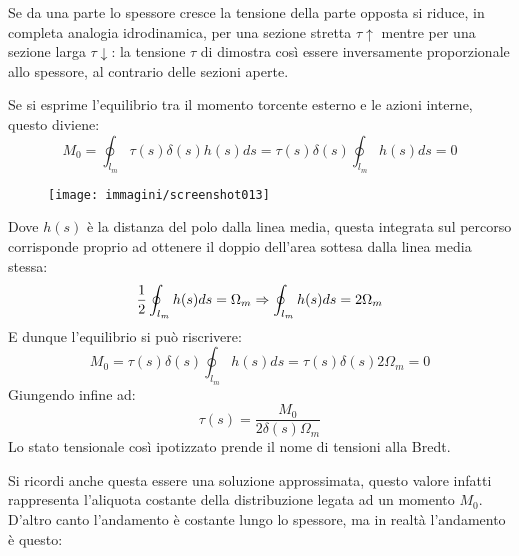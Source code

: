 \documentclass{article}
\begin{document}
\begin{adjustwidth}{2in}{}
\begin{figure}[H]
\begin{flushright}
	\end{flushright}
\end{figure}
		Se da una parte lo spessore cresce la tensione della parte opposta si riduce, in completa analogia idrodinamica, per una sezione stretta $\tau\uparrow$ mentre per una sezione larga $\tau\downarrow$: la tensione $\tau$ di dimostra così essere inversamente proporzionale allo spessore, al contrario delle sezioni aperte.\newline 
		
		Se si esprime l'equilibrio tra il momento torcente esterno e le azioni interne, questo diviene: 
		\[ M_0 = \oint_{l_m}\tau(s)\delta(s)h(s)ds = \tau(s)\delta(s)\oint_{l_m}h(s)ds = 0\]
		
\begin{figure}[H]
	\centering
	\label{fig:screenshot013}
	\texttt{[image: immagini/screenshot013]}
\end{figure}

		Dove $ h(s) $ è la distanza del polo dalla linea media, questa integrata sul percorso corrisponde proprio ad ottenere  il doppio dell'area sottesa dalla linea media stessa:
		\[{1\over2} \oint_{l_m}h(s)ds = \Omega_m \Rightarrow \oint_{l_m}h(s)ds = 2 \Omega_m\]
		E dunque l'equilibrio si può riscrivere: 
		\[ M_0 = \tau(s)\delta(s)\oint_{l_m}h(s)ds = \tau(s)\delta(s)2 \Omega_m = 0\]
		Giungendo infine ad: 
		\[ \tau(s) = \dfrac{M_0}{2\delta(s) \Omega_m}\]
		Lo stato tensionale così ipotizzato prende il nome di tensioni alla
		Bredt. \newline 
		
		Si ricordi anche questa essere una soluzione approssimata,	questo valore infatti rappresenta l’aliquota costante della distribuzione legata ad un momento $M_0$. D'altro canto l'andamento è costante lungo lo spessore, ma in realtà l'andamento è questo: 
		

\end{adjustwidth}
\end{document}
